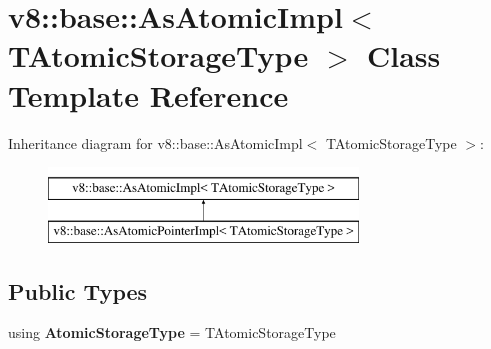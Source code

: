 \hypertarget{classv8_1_1base_1_1AsAtomicImpl}{}\section{v8\+:\+:base\+:\+:As\+Atomic\+Impl$<$ T\+Atomic\+Storage\+Type $>$ Class Template Reference}
\label{classv8_1_1base_1_1AsAtomicImpl}
Inheritance diagram for v8\+:\+:base\+:\+:As\+Atomic\+Impl$<$ T\+Atomic\+Storage\+Type $>$\+:\begin{figure}[H]
\begin{center}
\leavevmode
\includegraphics[height=2.000000cm]{classv8_1_1base_1_1AsAtomicImpl}
\end{center}
\end{figure}
\subsection*{Public Types}
\begin{DoxyCompactItemize}
\item 
\mbox{\label{classv8_1_1base_1_1AsAtomicImpl_af4f1ceb648b931dcc7c43917dd521661}} 
using {\bfseries Atomic\+Storage\+Type} = T\+Atomic\+Storage\+Type
\end{DoxyCompactItemize}
